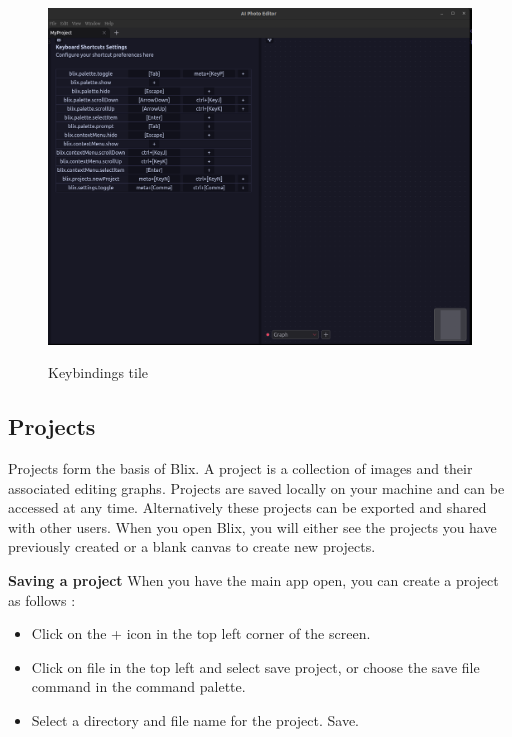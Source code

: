 \documentclass[11pt,a4paper]{article}
\begin{document}
\begin{figure}[H]
  \centering
  {\includegraphics[width=1.0\textwidth]{../pics/tutorial-keybindings.png}}
  \caption{Keybindings tile}
\end{figure}


\subsection*{Projects}

Projects form the basis of Blix. A project is a collection of images and their associated editing graphs. Projects are saved locally on your machine and can be accessed at any time. 
Alternatively these projects can be exported and shared with other users. When you open Blix, you will either see the projects you have previously created or a blank canvas to create new projects.

\textbf{Saving a project}
When you have the main app open, you can create a project as follows : 

\begin{itemize}
  \item[\textbullet] Click on the + icon in the top left corner of the screen.
  \item[\textbullet] Click on file in the top left and select save project, or choose the save file command in the command palette.
  \item[\textbullet] Select a directory and file name for the project. Save.
\end{itemize}
\end{document}
